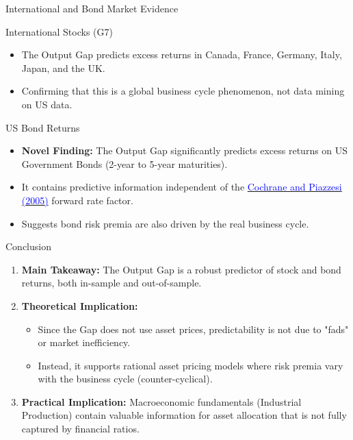 \documentclass{beamer}
\begin{document}
\begin{frame}{International and Bond Market Evidence}
    \begin{block}{International Stocks (G7)}
        \begin{itemize}
            \item The Output Gap predicts excess returns in Canada, France, Germany, Italy, Japan, and the UK.
            \item Confirming that this is a global business cycle phenomenon, not data mining on US data.
        \end{itemize}
    \end{block}

    \begin{block}{US Bond Returns}
        \begin{itemize}
            \item \textbf{Novel Finding:} The Output Gap significantly predicts excess returns on US Government Bonds (2-year to 5-year maturities).
            \item It contains predictive information independent of the \href{https://www.aeaweb.org/articles?id=10.1257/0002828053828581}{\textcolor{blue}{Cochrane and Piazzesi (2005)}} forward rate factor.
            \item Suggests bond risk premia are also driven by the real business cycle.
        \end{itemize}
    \end{block}
\end{frame}

\begin{frame}{Conclusion}
    \begin{enumerate}
        \item \textbf{Main Takeaway:} The Output Gap is a robust predictor of stock and bond returns, both in-sample and out-of-sample.
        
        \item \textbf{Theoretical Implication:} 
            \begin{itemize}
                \item Since the Gap does not use asset prices, predictability is not due to "fads" or market inefficiency.
                \item Instead, it supports rational asset pricing models where risk premia vary with the business cycle (counter-cyclical).
            \end{itemize}
            
        \item \textbf{Practical Implication:} Macroeconomic fundamentals (Industrial Production) contain valuable information for asset allocation that is not fully captured by financial ratios.
    \end{enumerate}
\end{frame}
\end{document}
